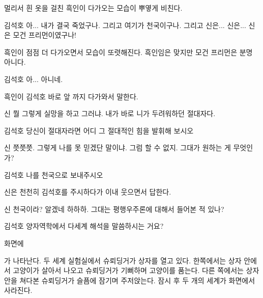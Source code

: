 \documentclass{screenplay}
\begin{document}
    멀리서 흰 옷을 걸친 흑인이 다가오는 모습이 뿌옇게 비친다.
    \begin{dialogue}{김석호}
        아... 내가 결국 죽었구나. 그리고 여기가 천국이구나. 그리고 신은... 신은...
        신은 모건 프리먼이였구나!
    \end{dialogue}
    
    흑인이 점점 더 다가오면서 모습이 또렷해진다. 흑인임은 맞지만 모건 프리먼은 분명 아니다.
    
    \begin{dialogue}[크게 실망하며]{김석호}
        아... 아니네.
    \end{dialogue}
    
    흑인이 김석호 바로 앞 까지 다가와서 말한다.
    \begin{dialogue}{신}
        뭘 그렇게 실망을 하고 그러냐. 내가 바로 니가 두려워하던 절대자다.
    \end{dialogue}
    \begin{dialogue}{김석호}
        당신이 절대자라면 어디 그 절대적인 힘을 발휘해 보시오
    \end{dialogue}
    \begin{dialogue}{신}
        쯧쯧쯧. 그렇게 나를 못 믿겠단 말이냐. 그럼 할 수 없지. 그대가 원하는 게 무엇인가?
    \end{dialogue}
    \begin{dialogue}[잠시 고민하다가]{김석호}
        나를 천국으로 보내주시오
    \end{dialogue}
    
    신은 천천히 김석호를 주시하다가 이내 웃으면서 답한다.
    
    \begin{dialogue}{신}
        천국이라? 알겠네 하하하. 그대는 평행우주론에 대해서 들어본 적 있나?
    \end{dialogue}
    
    \begin{dialogue}{김석호}
        양자역학에서 다세계 해석을 말씀하시는 거요?
    \end{dialogue}
    
    화면에 
    
    
    가 나타난다. 두 세계 실험실에서 슈뢰딩거가 상자를 열고 있다. 한쪽에서는 상자 안에서 고양이가 살아서 나오고 슈뢰딩거가 기뻐하며 고양이를 품는다. 다른 쪽에서는 상자 안을 쳐다본 슈뢰딩거가 슬픔에 잠기며 주저앉는다. 잠시 후 두 개의 세계가 화면에서 사라진다.
    
\end{document}

